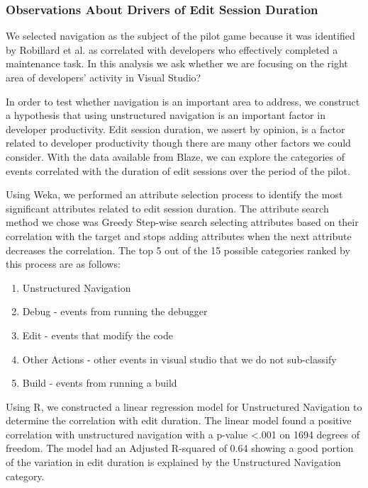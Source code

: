 \documentclass{sig-alternate}
\begin{document}
\subsubsection{Observations About Drivers of Edit Session Duration}

We selected navigation as the subject of the pilot game because it was identified by Robillard et al.\cite{wbsnipes:Robillard2004How} as correlated with developers who effectively completed a maintenance task.    In this analysis we ask whether we are focusing on the right area of developers' activity in Visual Studio?

In order to test whether navigation is an important area to address, we construct a hypothesis that using unstructured navigation is an important factor in developer productivity.  Edit session duration, we assert by opinion, is a factor related to developer productivity though there are many other factors we could consider.  With the data available from Blaze, we can explore the categories of events correlated with the duration of edit sessions over the period of the pilot.  

Using Weka\cite{Hall2009WEKA}, we performed an attribute selection process to identify the most significant attributes related to edit session duration.  The attribute search method we chose was Greedy Step-wise search selecting attributes based on their correlation with the target and stops adding attributes when the next attribute decreases the correlation.    The top 5 out of the 15 possible categories ranked by this process are as follows:
\begin{enumerate}[itemsep=0mm]
\item Unstructured Navigation
\item Debug - events from running the debugger
\item Edit - events that modify the code
\item Other Actions - other events in visual studio that we do not sub-classify
\item Build - events from running a build
\end{enumerate}

Using R\cite{Rcitation}, we constructed a linear regression model for Unstructured Navigation to determine the correlation with edit duration.  The linear model found a positive correlation with unstructured navigation with a p-value <.001 on 1694 degrees of freedom.  The model had an Adjusted R-squared of 0.64 showing a good portion of the variation in edit duration is explained by the Unstructured Navigation category. 
\end{document}
